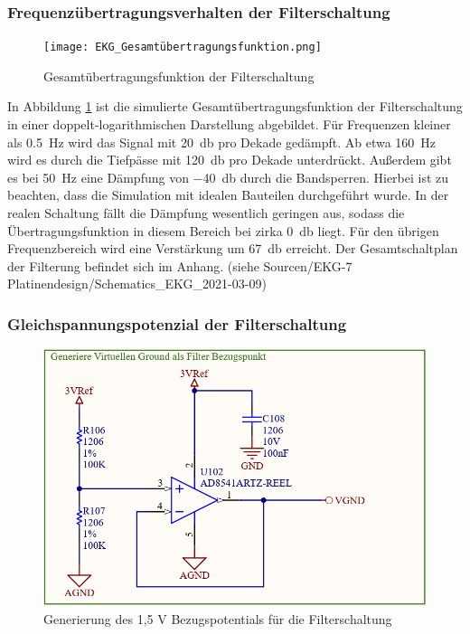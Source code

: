 \subsubsection{Frequenzübertragungsverhalten der Filterschaltung}

\begin{figure} [!h]
	\texttt{[image: EKG\_Gesamtübertragungsfunktion.png]}
	\caption{Gesamtübertragungsfunktion der Filterschaltung}
	\label{Bodediagramm Filterschaltung} 
\end{figure}

In Abbildung \ref{Bodediagramm Filterschaltung} ist die simulierte Gesamtübertragungsfunktion der Filterschaltung in einer doppelt-logarithmischen Darstellung abgebildet. Für Frequenzen kleiner als \SI{0,5}{\hertz} wird das Signal mit \SI{20}{\decibel} pro Dekade gedämpft. Ab etwa \SI{160}{\hertz} wird es durch die Tiefpässe mit \SI{120}{\decibel} pro Dekade unterdrückt. Außerdem gibt es bei \SI{50}{\hertz} eine Dämpfung von \SI{-40}{\decibel} durch die Bandsperren. Hierbei ist zu beachten, dass die Simulation mit idealen Bauteilen durchgeführt wurde. In der realen Schaltung fällt die Dämpfung wesentlich geringen aus, sodass die Übertragungsfunktion in diesem Bereich bei zirka \SI{0}{\decibel} liegt. Für den übrigen Frequenzbereich wird eine Verstärkung um \SI{67}{\decibel} erreicht. Der Gesamtschaltplan der Filterung befindet sich im Anhang. (siehe Sourcen/EKG-7 Platinendesign/Schematics_EKG_2021-03-09)

\subsubsection{Gleichspannungspotenzial der Filterschaltung}

\begin{figure} [!h]
	\includegraphics[width=\textwidth] {EKG_virtueller_Ground.png}
	\caption{Generierung des 1,5 V Bezugspotentials für die Filterschaltung}
	\label{Virtueller GND} 
\end{figure}

